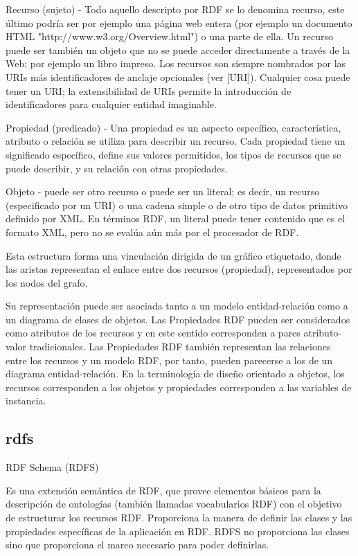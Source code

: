 Recurso (sujeto) - Todo aquello descripto por RDF se lo denomina recurso, este último podría ser por ejemplo una página web entera (por ejemplo 
un documento HTML "http://www.w3.org/Overview.html") o una parte de ella.  Un recurso puede ser también un objeto que no 
se puede acceder directamente a través de la Web; por ejemplo un libro impreso. Los recursos son siempre nombrados por las 
URIs más identificadores de anclaje opcionales (ver [URI]). Cualquier cosa puede tener un URI; la extensibilidad de URIs 
permite la introducción de identificadores para cualquier entidad imaginable.

Propiedad (predicado) - Una propiedad es un aspecto específico, característica, atributo o relación se utiliza para describir un recurso. 
Cada propiedad tiene un significado específico, define sus valores permitidos, los tipos de recursos que se puede describir, 
y su relación con otras propiedades. 

Objeto - puede ser otro recurso o puede ser un literal; es decir, un recurso (especificado por un URI) o una cadena simple o 
de otro tipo de datos primitivo definido por XML. En términos RDF, un literal puede tener contenido que es el formato XML,
pero no se evalúa aún más por el procesador de RDF.

Esta estructura forma una vinculación dirigida de un gráfico etiquetado, donde las aristas representan el enlace entre dos 
recursos (propiedad), representados por los nodos del grafo.

Su representación puede ser asociada tanto a un modelo entidad-relación como a un diagrama de clases de objetos.
Las Propiedades RDF pueden ser considerados como atributos de los recursos y en este sentido corresponden a pares 
atributo-valor tradicionales. Las Propiedades RDF también representan las relaciones entre los recursos y un modelo RDF,
por tanto, pueden parecerse a los de un diagrama entidad-relación.
En la terminología de diseño orientado a objetos, los recursos corresponden a los objetos y propiedades 
corresponden a las variables de instancia.

\subsection{rdfs}
RDF Schema (RDFS)

Es una extensión semántica de RDF, que provee elementos básicos para la descripción de ontologías (también llamadas vocabularios RDF) con el objetivo
de estructurar los recursos RDF. Proporciona la manera de definir las clases y las propiedades específicas de la aplicación en RDF.
RDFS no proporciona las clases sino que proporciona el marco necesario para poder definirlas.

